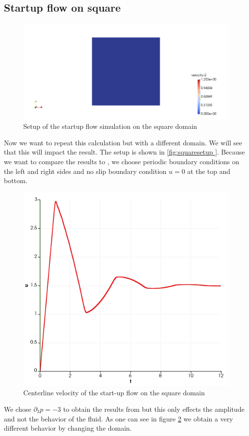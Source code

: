 \documentclass[12pt,a4paper,twoside, open=right]{scrreprt}
\theoremstyle{definition}
\theoremstyle{plain}
\begin{document}
\subsection{Startup flow on square}
\begin{figure}
    \centering
    \includegraphics[width=\textwidth]{SquareSetup}
    \caption{Setup of the startup flow simulation on the square domain}
    \label{fig:squaresetup}
\end{figure}
Now we want to repeat this calculation but with a different domain. We will see that this will impact the result. The setup is shown in \ref{fig:squaresetup
}. Because we want to compare the results to \cite{A.S.RDuarte2008}, we choose periodic boundary conditions on the left and right sides and no slip boundary condition $u=0$ at the top and bottom.
\begin{figure}
    \centering
    \includegraphics[width=\textwidth]{SquareCenterline}
    \caption{Centerline velocity of the start-up flow on the square domain}
    \label{fig:squarecenterline}
\end{figure}
We chose $\partial_3 p=-3$ to obtain the results from \cite{A.S.RDuarte2008} but this only effects the amplitude and not the behavior of the fluid. As one can see in figure \ref{fig:squarecenterline} we obtain a very different behavior by changing the domain.
\end{document}
